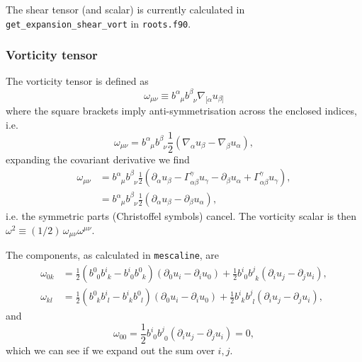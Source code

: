 \documentclass[a4paper]{article}
\newcommand{\ph}{\phantom}
\newcommand{\pd}{\partial}
\newcommand{\mesc}{\texttt{mescaline}}
\begin{document}
The shear tensor (and scalar) is currently calculated in \texttt{get\_expansion\_shear\_vort} in \texttt{roots.f90}.


\subsubsection{Vorticity tensor}

The vorticity tensor is defined as
\begin{equation}
	\omega_{\mu\nu} \equiv b^\alpha_{\ph{\alpha}\mu} b^\beta_{\ph{\beta}\nu} \nabla_{[\alpha} u_{\beta]}
\end{equation}
where the square brackets imply anti-symmetrisation across the enclosed indices, i.e.
\begin{equation}
	\omega_{\mu\nu} = b^\alpha_{\ph{\alpha}\mu} b^\beta_{\ph{\beta}\nu} \frac{1}{2} \left( \nabla_\alpha u_\beta - \nabla_\beta u_\alpha \right),
\end{equation}
expanding the covariant derivative we find
\begin{align}
	\omega_{\mu\nu} &= b^\alpha_{\ph{\alpha}\mu} b^\beta_{\ph{\beta}\nu} \frac{1}{2} \left( \pd_\alpha u_\beta - \Gamma^\gamma_{\alpha\beta} u_\gamma - \pd_\beta u_\alpha + \Gamma^\gamma_{\alpha\beta} u_\gamma \right), \\
				&= b^\alpha_{\ph{\alpha}\mu} b^\beta_{\ph{\beta}\nu} \frac{1}{2} \left( \pd_\alpha u_\beta - \pd_\beta u_\alpha \right),
\end{align}
i.e. the symmetric parts (Christoffel symbols) cancel. The vorticity scalar is then $\omega^2 \equiv (1/2)\, \omega_{\mu\nu} \omega^{\mu\nu}$.

The components, as calculated in \mesc, are
\begin{align}
	\omega_{0k} &= \frac{1}{2} \left(  b^0_{\ph{0}0} b^i_{\ph{i}k} - b^i_{\ph{i}0} b^0_{\ph{0}k} \right) \left(\pd_0 u_i - \pd_i u_0 \right) + \frac{1}{2} b^i_{\ph{i}0} b^j_{\ph{j}k} \left( \pd_i u_j - \pd_j u_i \right), \\
	\omega_{kl} &= \frac{1}{2} \left( b^0_{\ph{0}k} b^i_{\ph{i}l} - b^i_{\ph{i}k} b^0_{\ph{0}l} \right) \left( \pd_0 u_i - \pd_i u_0 \right) + \frac{1}{2} b^i_{\ph{i}k} b^j_{\ph{j}l} \left( \pd_i u_j - \pd_j u_i \right),
\end{align}
and
\begin{equation}
	\omega_{00}=\frac{1}{2} b^i_{\ph{i}0} b^j_{\ph{j}0} \left( \pd_i u_j - \pd_j u_i \right) = 0,
\end{equation}
which we can see if we expand out the sum over $i,j$.
\end{document}
